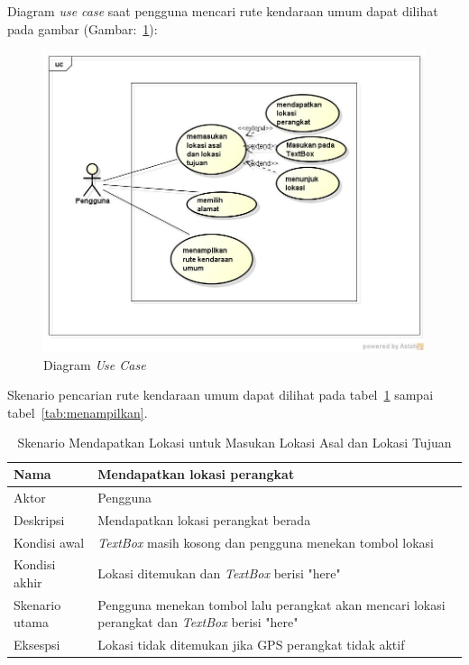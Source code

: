 \newpage
Diagram \textit{use case} saat pengguna mencari rute kendaraan umum dapat dilihat pada gambar (Gambar:~\ref{fig:UseCase}):
\begin{figure}[h]
	\centering
		\includegraphics[scale=0.5]{Gambar/useCase_dan_Class/UseCase}
	\caption{Diagram \textit{Use Case}}
	\label{fig:UseCase}
\end{figure}

Skenario pencarian rute kendaraan umum dapat dilihat pada tabel~\ref{tab:mandapatLokasi} sampai tabel~\ref{tab:menampilkan}.
\begin{table}[H]
	\centering
		\begin{tabular}{ |p{2cm}|p{10cm}| }
			\hline
			Nama &  Mendapatkan lokasi perangkat\\ \hline
			Aktor & Pengguna  \\ \hline
			Deskripsi & Mendapatkan lokasi perangkat berada  \\ \hline
			Kondisi awal & \textit{TextBox} masih kosong dan pengguna menekan tombol lokasi \\ \hline
			Kondisi akhir & Lokasi ditemukan dan \textit{TextBox} berisi "here" \\ \hline
			Skenario utama & Pengguna menekan tombol lalu perangkat akan mencari lokasi perangkat dan \textit{TextBox} berisi "here" \\ \hline
			Eksespsi & Lokasi tidak ditemukan jika GPS perangkat tidak aktif  \\ 
			\hline
		\end{tabular}
	\caption{Skenario Mendapatkan Lokasi untuk Masukan Lokasi Asal dan Lokasi Tujuan}
	\label{tab:mandapatLokasi}
\end{table}


